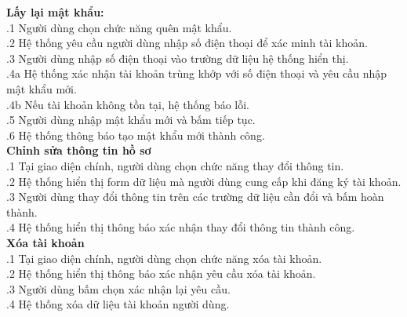 \begin{small}
\textbf{Lấy lại mật khẩu:}\\
.1 Người dùng chọn chức năng quên mật khẩu.\\
.2 Hệ thống yêu cầu người dùng nhập số điện thoại để xác minh tài khoản.\\
.3 Người dùng nhập số điện thoại vào trường dữ liệu hệ thống hiển thị.\\
.4a Hệ thống xác nhận tài khoản trùng khớp với số điện thoại và yêu cầu nhập mật khẩu mới.\\
.4b Nếu tài khoản không tồn tại, hệ thống báo lỗi.\\
.5 Người dùng nhập mật khẩu mới và bấm tiếp tục.\\
.6 Hệ thống thông báo tạo mật khẩu mới thành công.\\

\textbf{Chỉnh sửa thông tin hồ sơ}\\
.1 Tại giao diện chính, người dùng chọn chức năng thay đổi thông tin.\\
.2 Hệ thống hiển thị form dữ liệu mà người dùng cung cấp khi đăng ký tài khoản.\\
.3 Người dùng thay đổi thông tin trên các trường dữ liệu cần đổi và bấm hoàn thành.\\
.4 Hệ thống hiển thị thông báo xác nhận thay đổi thông tin thành công.\\

\textbf{Xóa tài khoản}\\
.1 Tại giao diện chính, người dùng chọn chức năng xóa tài khoản.\\
.2 Hệ thống hiển thị thông báo xác nhận yêu cầu xóa tài khoản.\\
.3 Người dùng bấm chọn xác nhận lại yêu cầu.\\
.4 Hệ thống xóa dữ liệu tài khoản người dùng.\\
\end{small}\\


